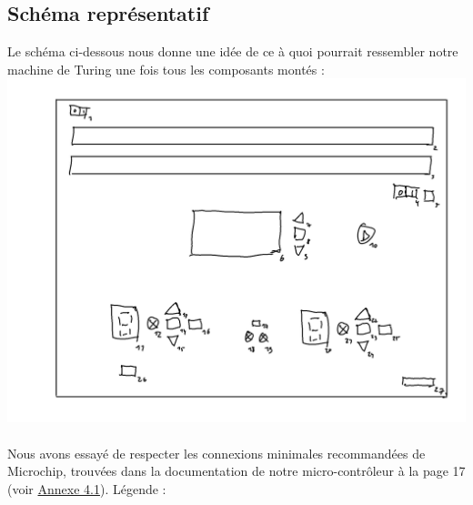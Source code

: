 \documentclass[12pt]{report}
\begin{document}
	\subsection{Schéma représentatif}
	Le schéma ci-dessous nous donne une idée de ce à quoi pourrait ressembler notre machine de Turing une fois tous les composants montés :\\
	\includegraphics[width=\textwidth]{img/rep_machine}
	\\
	\\
	Nous avons essayé de respecter les connexions minimales recommandées de Microchip, trouvées dans la documentation de notre micro-contrôleur à la page 17 (voir \hyperref[sec:an4.1]{Annexe 4.1}).
	Légende :\\
\end{document}
